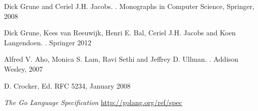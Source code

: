 \documentclass[12pt]{article}
\begin{document}
\nocite{Parsing, Modern Compiler Design, Dragon Book, ABNF}
\begin{thebibliography}{99}
	Dick Grune and Ceriel J.H. Jacobs.
	.
	\newblock Monographs in Computer Science, Springer, 2008
	
	Dick Grune, Kees van Reeuwijk, Henri E. Bal, Ceriel J.H. Jacobs and Koen Langendoen.
	.
	\newblock Springer 2012

	Alfred V. Aho, Monica S. Lam, Ravi Sethi and Jeffrey D. Ullman.
	.
	\newblock Addison Wesley, 2007

	D. Crocker, Ed.
	\newblock RFC 5234, January 2008

	{\em The Go Language Specification}
	\newblock \url{http://golang.org/ref/spec}

	
\end{thebibliography}
\end{document}
